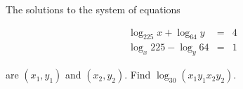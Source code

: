 The solutions to the system of equations

\begin{eqnarray*} \log_{225}{x}+\log_{64}{y} &=& 4\\ \log_x{225}-\log_y{64} &=& 1 \end{eqnarray*}

are $(x_1,y_1)$ and $(x_2, y_2).$ Find $\log_{30}{(x_1y_1x_2y_2)}.$